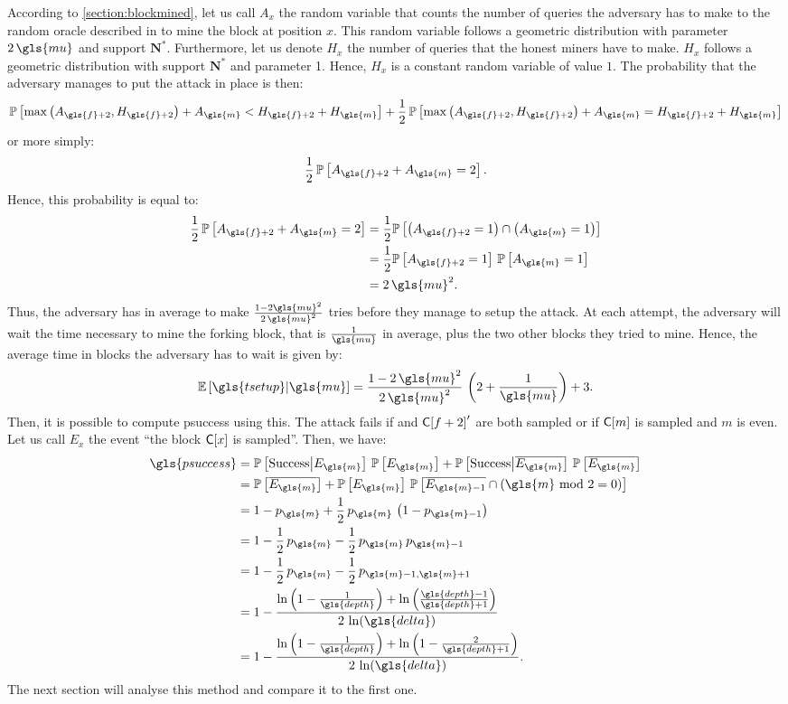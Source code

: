 According to \autoref{section:blockmined}, let us call \(A_x\) the random variable that counts the number of queries the adversary has to make to the random oracle described in \cite{Backbone} to mine the block at position \(x\). This random variable follows a geometric distribution with parameter \(2\,\gls{mu}\) and support \(\mathbf{N}^*\). Furthermore, let us denote \(H_x\) the number of queries that the honest miners have to make. \(H_x\) follows a geometric distribution with support \(\mathbf{N}^*\) and parameter 1. Hence, \(H_x\) is a constant random variable of value \(1\).  The probability that the adversary manages to put the attack in place is then:
\[\P{\max\left(A_{\gls{f}+2},H_{\gls{f}+2}\right)+A_{\gls{m}} < H_{\gls{f}+2}+H_{\gls{m}}} + \frac12\,\P{\max\left(A_{\gls{f}+2},H_{\gls{f}+2}\right)+A_{\gls{m}} = H_{\gls{f}+2}+H_{\gls{m}}}\]
or more simply:
\[\frac12\,\P{A_{\gls{f}+2}+A_{\gls{m}} = 2}.\]
Hence, this probability is equal to:
\begin{align*}
    \frac12\,\P{A_{\gls{f}+2}+A_{\gls{m}} = 2} &= \frac12\P{\left(A_{\gls{f}+2}=1\right)\cap\left(A_{\gls{m}}=1\right)}\\
    &= \frac12\P{A_{\gls{f}+2}=1}\,\P{A_{\gls{m}}=1}\\
    &= 2\,\gls{mu}^2.
\end{align*}
Thus, the adversary has in average to make \(\frac{1-2\gls{mu}^2}{2\,\gls{mu}^2}\) tries before they manage to setup the attack. At each attempt, the adversary will wait the time necessary to mine the forking block, that is \(\frac{1}{\gls{mu}}\) in average, plus the two other blocks they tried to mine. Hence, the average time in blocks the adversary has to wait is given by:
\[\ES{\gls{tsetup}}{\gls{mu}} = \frac{1-2\,\gls{mu}^2}{2\,\gls{mu}^2}\,\left(2+\frac{1}{\gls{mu}}\right)+3.\]
Then, it is possible to compute \gls{psuccess} using this. The attack fails if  and \(\mathsf{C[}f+2\mathsf{]}'\) are both sampled or if \(\mathsf{C[}m\mathsf{]}\) is sampled and \(m\) is even. Let us call \(E_x\) the event \enquote{the block \(\mathsf{C[}x\mathsf{]}\) is sampled}. Then, we have:
\begin{align*}
    \gls{psuccess} &= \PS{\text{Success}}{E_{\gls{m}}}\,\P{E_{\gls{m}}} + \PS{\text{Success}}{\overline{E_{\gls{m}}}}\,\P{\overline{E_{\gls{m}}}}\\
    &= \P{\overline{E_{\gls{m}}}} + \P{E_{\gls{m}}}\,\P{\overline{E_{\gls{m}-1}}\cap\left(\gls{m}\ \mathrm{mod}\ 2=0\right)}\\
    &= 1 - p_{\gls{m}} + \frac12\,p_{\gls{m}}\,\left(1-p_{\gls{m}-1}\right)\\
    &= 1 - \frac12\,p_{\gls{m}} - \frac12\,p_{\gls{m}}\,p_{\gls{m}-1}\\
    &= 1 - \frac12\,p_{\gls{m}} - \frac12\,p_{\gls{m}-1,\gls{m}+1}\\
    &= 1 - \frac{\ln\left(1 - \frac{1}{\gls{depth}}\right) + \ln\left(\frac{\gls{depth}-1}{\gls{depth}+1}\right)}{2\,\ln(\gls{delta})}\\
    &= 1 - \frac{\ln\left(1 - \frac{1}{\gls{depth}}\right) + \ln\left(1-\frac{2}{\gls{depth}+1}\right)}{2\,\ln(\gls{delta})}.
\end{align*}
The next section will analyse this method and compare it to the first one.


